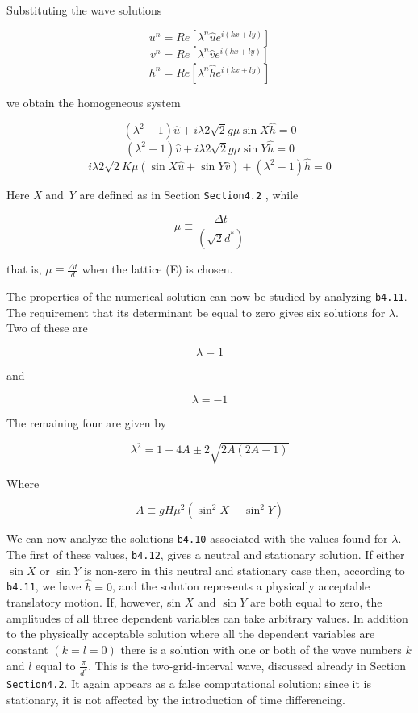 Substituting the wave solutions

\[u^n = Re \left[ \lambda^n \widehat{u} e^{i(kx+ly)} \right]\]\[v^n = Re \left[ \lambda^n \widehat{v} e^{i(kx+ly)} \right]\]\[h^n = Re \left[ \lambda^n \widehat{h} e^{i(kx+ly)} \right]\]

we obtain the homogeneous system

\[\left( \lambda^{2} - 1 \right)\widehat{u} + i\lambda 2\sqrt{2}g\mu \sin{X}\widehat{h} = 0\]\[\left( \lambda^{2} - 1 \right)\widehat{v} + i\lambda 2\sqrt{2}g\mu \sin{Y}\widehat{h} = 0\]\[i\lambda 2\sqrt{2}K\mu \left( \sin{X}\widehat{u} + \sin{Y}\widehat{v} \right) + \left( \lambda^{2} - 1 \right)\widehat{h} = 0\]

Here \emph{X} and \emph{Y} are defined as in Section \texttt{Section4.2}
, while

\[\mu \equiv \frac{\Delta t}{\left( \sqrt{2}d^{*} \right)}\]

that is, \(\mu \equiv \frac{\Delta t}{d}\) when the lattice (E) is
chosen.

The properties of the numerical solution can now be studied by analyzing
\texttt{b4.11}. The requirement that its determinant be equal to zero
gives six solutions for \(\lambda\). Two of these are

\[\lambda = 1\]

and

\[\lambda = - 1\]

The remaining four are given by

\[\lambda^{2} = 1 - 4A \pm 2\sqrt{2A( 2A - 1 )}\]

Where

\[A \equiv gH\mu^{2}\left( \sin^{2}X + \sin^{2}Y \right)\]

We can now analyze the solutions \texttt{b4.10} associated with the
values found for \(\lambda\). The first of these values, \texttt{b4.12},
gives a neutral and stationary solution. If either \(\sin{X}\) or
\(\sin{Y}\) is non-zero in this neutral and stationary case then,
according to \texttt{b4.11}, we have \(\widehat{h} = 0\), and the
solution represents a physically acceptable translatory motion. If,
however, sin \(X\) and \(\sin{Y}\) are both equal to zero, the
amplitudes of all three dependent variables can take arbitrary values.
In addition to the physically acceptable solution where all the
dependent variables are constant \(\left( k = l = 0 \right)\) there is a
solution with one or both of the wave numbers \(k\) and \(l\) equal to
\(\frac{\pi}{d^{*}}\). This is the two-grid-interval wave, discussed
already in Section \texttt{Section4.2}. It again appears as a false
computational solution; since it is stationary, it is not affected by
the introduction of time differencing.

